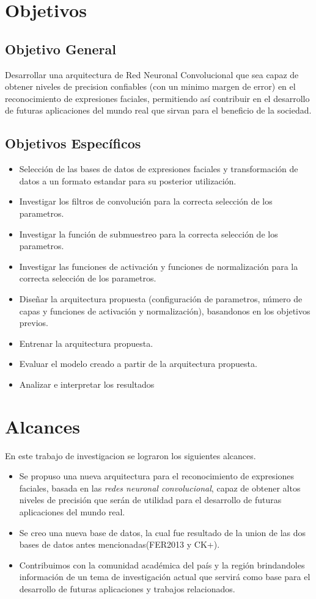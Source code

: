 \section{Objetivos}
\subsection{Objetivo General}
Desarrollar una arquitectura de Red Neuronal Convolucional que sea capaz de obtener niveles de precision confiables (con un minimo margen de error) en el reconocimiento de expresiones faciales, permitiendo así contribuir en el desarrollo de futuras aplicaciones del mundo real que sirvan para el beneficio de la sociedad.
\subsection{Objetivos Específicos}
\begin{itemize}
\item Selección de las bases de datos de expresiones faciales y transformación de datos a un formato estandar para su posterior utilización.
\item Investigar los filtros de convolución para la correcta selección de los parametros.
\item Investigar la función de submuestreo para la correcta selección de los parametros. 
\item Investigar las funciones de activación y funciones de normalización para la correcta selección de los parametros.
\item Diseñar la arquitectura propuesta (configuración de parametros, número de capas y funciones de activación y normalización), basandonos en los objetivos previos.
\item Entrenar la arquitectura propuesta.	
\item Evaluar el modelo creado a partir de la arquitectura propuesta.
\item Analizar e interpretar los resultados
\end{itemize}

\section{Alcances}
En este trabajo de investigacion se lograron los siguientes alcances.

\begin{itemize}
\item Se propuso una nueva arquitectura para el reconocimiento de expresiones faciales, basada en las \textit{redes neuronal convolucional}, capaz de obtener altos niveles de precisión que serán de utilidad para el desarrollo de futuras aplicaciones del mundo real.
\item Se creo una nueva base de datos, la cual fue resultado de la union de las dos bases de datos antes mencionadas(FER2013 y CK+).
\item Contribuimos con la comunidad académica del país y la región brindandoles información de un tema de investigación actual que servirá como base para el desarrollo de futuras aplicaciones y trabajos relacionados.
\end{itemize}
 

